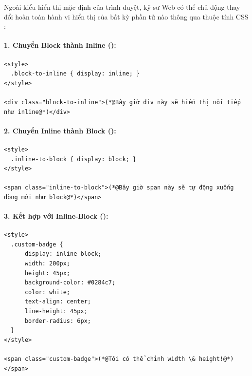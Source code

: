 Ngoài kiểu hiển thị mặc định của trình duyệt, kỹ sư Web có thể chủ động thay đổi hoàn toàn hành vi hiển thị của bất kỳ phần tử nào thông qua thuộc tính CSS :

\paragraph{1. Chuyển Block thành Inline ():}
\begin{codeWindow}
\begin{lstlisting}[language=HTML5]
<style>
  .block-to-inline { display: inline; }
</style>

<div class="block-to-inline">(*@Bây giờ div này sẽ hiển thị nối tiếp như inline@*)</div>
\end{lstlisting}
\end{codeWindow}

\paragraph{2. Chuyển Inline thành Block ():}
\begin{codeWindow}
\begin{lstlisting}[language=HTML5]
<style>
  .inline-to-block { display: block; }
</style>

<span class="inline-to-block">(*@Bây giờ span này sẽ tự động xuống dòng mới như block@*)</span>
\end{lstlisting}
\end{codeWindow}

\paragraph{3. Kết hợp với Inline-Block ():}
\begin{codeWindow}
\begin{lstlisting}[language=HTML5]
<style>
  .custom-badge {
      display: inline-block;
      width: 200px;
      height: 45px;
      background-color: #0284c7;
      color: white;
      text-align: center;
      line-height: 45px;
      border-radius: 6px;
  }
</style>

<span class="custom-badge">(*@Tôi có thể chỉnh width \& height!@*)</span>
\end{lstlisting}
\end{codeWindow}

